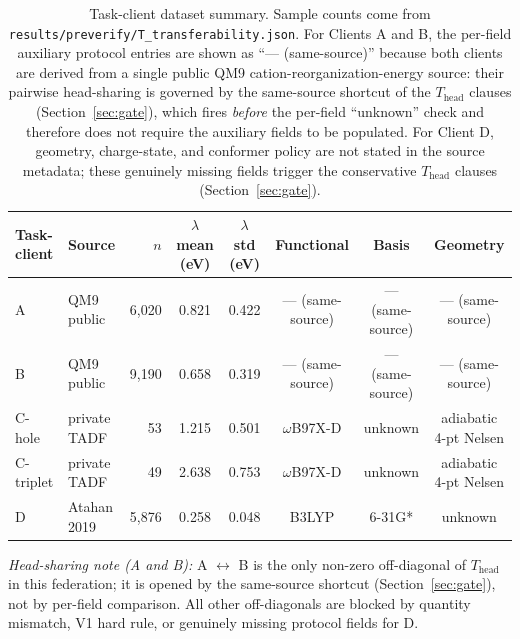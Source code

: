 \documentclass[11pt,a4paper]{article}
\begin{document}
\begin{figure}[t]
\label{fig:forest}
\end{figure}


\clearpage

\begin{table}[t]
\centering
\footnotesize
\caption{Task-client dataset summary. Sample counts come from \texttt{results/preverify/T\_transferability.json}. For Clients A and B, the per-field auxiliary protocol entries are shown as ``--- (same-source)'' because both clients are derived from a single public QM9 cation-reorganization-energy source: their pairwise head-sharing is governed by the same-source shortcut of the $T_{\mathrm{head}}$ clauses (Section~\ref{sec:gate}), which fires \emph{before} the per-field ``unknown'' check and therefore does not require the auxiliary fields to be populated. For Client D, geometry, charge-state, and conformer policy are not stated in the source metadata; these genuinely missing fields trigger the conservative $T_{\mathrm{head}}$ clauses (Section~\ref{sec:gate}).}\label{tab:task-clients}
\begin{tabular}{@{}llrccccc@{}}
\toprule
Task-client & Source & $n$ & $\lambda$ mean (eV) & $\lambda$ std (eV) & Functional & Basis & Geometry \\
\midrule
A         & QM9 public   & 6{,}020 & 0.821 & 0.422 & --- (same-source) & --- (same-source) & --- (same-source) \\
B         & QM9 public   & 9{,}190 & 0.658 & 0.319 & --- (same-source) & --- (same-source) & --- (same-source) \\
C-hole    & private TADF & 53      & 1.215 & 0.501 & $\omega$B97X-D & unknown & adiabatic 4-pt Nelsen \\
C-triplet & private TADF & 49      & 2.638 & 0.753 & $\omega$B97X-D & unknown & adiabatic 4-pt Nelsen \\
D         & Atahan 2019  & 5{,}876 & 0.258 & 0.048 & B3LYP & 6-31G* & unknown \\
\bottomrule
\end{tabular}

\smallskip
\noindent\footnotesize\textit{Head-sharing note (A and B):} A $\leftrightarrow$ B is the only non-zero off-diagonal of $T_{\mathrm{head}}$ in this federation; it is opened by the same-source shortcut (Section~\ref{sec:gate}), not by per-field comparison. All other off-diagonals are blocked by quantity mismatch, V1 hard rule, or genuinely missing protocol fields for D.
\end{table}
\end{document}
